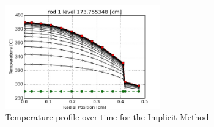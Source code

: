 \begin{figure}[!h]
	\centering
	\includegraphics[width=0.60\textwidth]{images/profile_rod1_level_10_I.jpg}
	\caption{Temperature profile over time for the Implicit Method}
	\label{fig:profile_rod1_level_10_I}
\end{figure}











